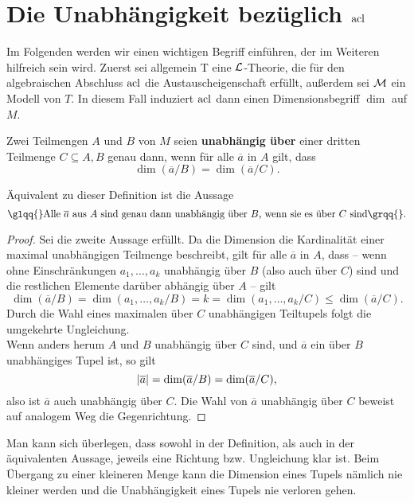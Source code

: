 \chapter{Die Unabhängigkeit bezüglich $\operatorname{acl}$}
Im Folgenden werden wir einen wichtigen Begriff einführen, der im Weiteren hilfreich sein wird. Zuerst sei allgemein T eine $\mathcal{L}$-Theorie, die für den algebraischen Abschluss $\operatorname{acl}$ die Austauscheigenschaft erfüllt, außerdem sei $\mathcal{M}$ ein Modell von $T$. In diesem Fall induziert $\operatorname{acl}$ dann einen Dimensionsbegriff $\dim$ auf $M$.

\begin{definition}
	Zwei Teilmengen $A$ und $B$ von $M$ seien \textbf{unabhängig über} einer dritten Teilmenge $C\subseteq A,B$ genau dann, wenn für alle $\overline{a}$ in $A$ gilt, dass $$\dim(\overline{a}/B)=\dim(\overline{a}/C).$$
\end{definition}

\begin{lemma}
	Äquivalent zu dieser Definition ist die Aussage
	$$\glqq{}\text{Alle }\overline{a}\text{ aus }A\text{ sind genau dann unabhängig über }B\text{, wenn sie es über }C\text{ sind}\grqq{}.$$
\end{lemma}
\begin{proof}
	Sei die zweite Aussage erfüllt. Da die Dimension die Kardinalität einer maximal unabhängigen Teilmenge beschreibt, gilt für alle $\overline{a}$ in $A$, dass \--- wenn ohne Einschränkungen $a_1,\dots,a_k$ unabhängig über $B$ (also auch über $C$) sind und die restlichen Elemente darüber abhängig über $A$ \--- gilt $$\dim(\overline{a}/B)=\dim(a_1,\dots,a_k/B)=k=\dim(a_1,\dots,a_k/C)\leq\dim(\overline{a}/C).$$
	Durch die Wahl eines maximalen über $C$ unabhängigen Teiltupels folgt die umgekehrte Ungleichung.\\
	Wenn anders herum $A$ und $B$ unabhängig über $C$ sind, und $\overline{a}$ ein über $B$ unabhängiges Tupel ist, so gilt
	$${\left| \overline{a} \right|}=\dim(\overline{a}/B)=\dim(\overline{a}/C),$$
	also ist $\overline{a}$ auch unabhängig über $C$. Die Wahl von $\overline{a}$ unabhängig über $C$ beweist auf analogem Weg die Gegenrichtung.
\end{proof}

\begin{remark}
	Man kann sich überlegen, dass sowohl in der Definition, als auch in der äquivalenten Aussage, jeweils eine Richtung bzw. Ungleichung klar ist. Beim Übergang zu einer kleineren Menge kann die Dimension eines Tupels nämlich nie kleiner werden und die Unabhängigkeit eines Tupels nie verloren gehen.
\end{remark}

